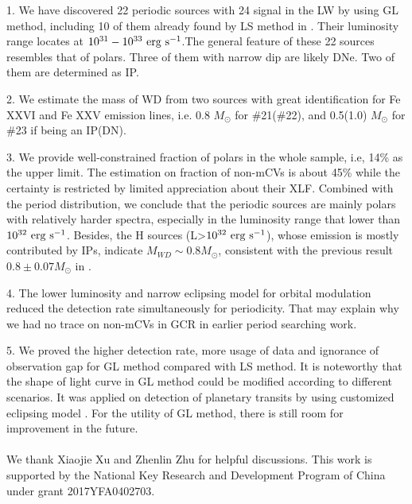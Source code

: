 \documentclass[twoside,twocolumn]{aastex63}
\begin{document}
1. We have discovered 22 periodic sources with 24 signal in the LW by using GL method, including 10 of them already found by LS method in \cite{2012ApJ...746..165H}. Their luminosity range locates at $\rm 10^{31}-10^{33}~erg~s^{-1} $.The general feature of these 22 sources resembles that of polars. Three of them with narrow dip are likely DNe. Two of them are determined as IP.

2.  We estimate the mass of WD from two sources with great identification for Fe XXVI and Fe XXV emission lines, i.e. 0.8 $M_\odot$ for \#21(\#22), and 0.5(1.0) $M_\odot$ for \#23 if being an IP(DN). 

3. We provide well-constrained fraction of polars in the whole sample, i.e, 14\% as the upper limit. The estimation on fraction of non-mCVs is about 45\% while the certainty is restricted by limited appreciation about their XLF. Combined with the period distribution, we conclude that the periodic sources are mainly polars with relatively harder spectra, especially in the luminosity range that lower than $\rm 10^{32}~erg~s^{-1}$. Besides, the H sources (L>$\rm 10^{32}~erg~s^{-1}$), whose emission is mostly contributed by IPs, indicate  $M_{WD} \sim 0.8 M_\odot$, consistent with the previous result $0.8\pm 0.07 M_\odot$ in \citep{2018ApJ...853..182Y}.

4. The lower luminosity and narrow eclipsing model for orbital modulation reduced the detection rate simultaneously for periodicity. That may explain why we had no trace on non-mCVs in GCR in earlier period searching work.

5. We proved the higher detection rate, more usage of data and ignorance of observation gap for GL method compared with LS method. It is noteworthy that the shape of light curve in GL method could be modified according to different scenarios. It was applied on detection of planetary transits by using customized eclipsing model \citep{2002A&A...395..625A}. For the utility of GL method, there is still room for improvement in the future.
\\
\\

We thank Xiaojie Xu and Zhenlin Zhu for helpful discussions. This work is supported by the National Key Research and Development Program of China under grant 2017YFA0402703.

\end{document}
